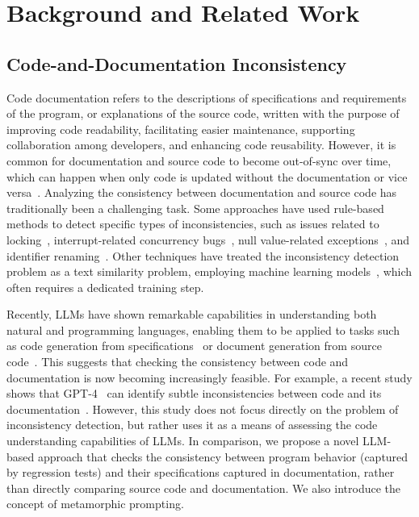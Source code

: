\section{Background and Related Work}
\label{sec:background}



\subsection{Code-and-Documentation Inconsistency}

Code documentation refers to the descriptions of specifications and requirements of the program, or explanations of the source code, written with the purpose of improving code readability, facilitating easier maintenance, supporting collaboration among developers, and enhancing code reusability. However, it is common for documentation and source code to become out-of-sync over time, which can happen when only code is updated without the documentation or vice versa~\cite{evolutionOfCodeComments}. Analyzing the consistency between documentation and source code has traditionally been a challenging task. Some approaches have used rule-based methods to detect specific types of inconsistencies, such as issues related to locking~\cite{tan2007icomment}, interrupt-related concurrency bugs~\cite{tan2011acomment}, null value-related exceptions~\cite{tan2012tcomment}, and identifier renaming~\cite{ratol2017detecting}. Other techniques have treated the inconsistency detection problem as a text similarity problem, employing machine learning models~\cite{corazza2018coherence, panthaplackel2021deep, rabbi2020detecting}, which often requires a dedicated training step.

Recently, LLMs have shown remarkable capabilities in understanding both natural and programming languages, enabling them to be applied to tasks such as code generation from specifications~\cite{li2022competition, shin2023prompt} or document generation from source code~\cite{sun2023automatic, ahmed2023improving, shin2023prompt}. This suggests that checking the consistency between code and documentation is now becoming increasingly feasible. For example, a recent study shows that GPT-4~\cite{achiam2023gpt} can identify subtle inconsistencies between code and its documentation~\cite{li2024mutation}. However, this study does not focus directly on the problem of inconsistency detection, but rather uses it as a means of assessing the code understanding capabilities of LLMs. In comparison, we propose a novel LLM-based approach that checks the consistency between program behavior (captured by regression tests) and their specifications captured in documentation, rather than directly comparing source code and documentation. We also introduce the concept of metamorphic prompting. 

